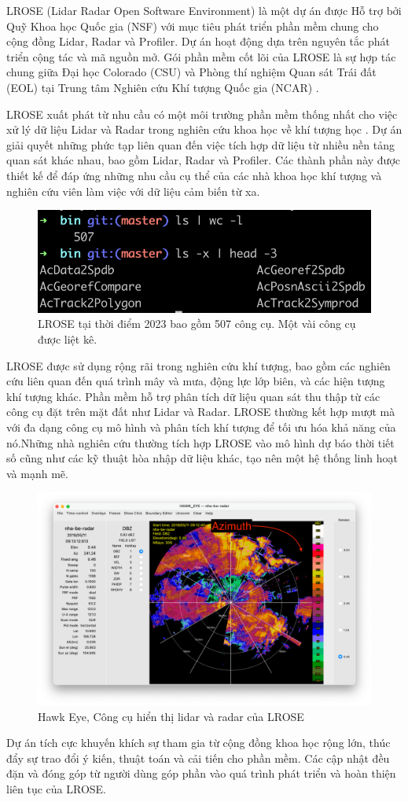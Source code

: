 LROSE (Lidar Radar Open Software Environment) là một dự án được Hỗ trợ bởi Quỹ Khoa học Quốc gia (NSF) với mục tiêu phát triển phần mềm chung cho cộng đồng Lidar, Radar và Profiler. Dự án hoạt động dựa trên nguyên tắc phát triển cộng tác và mã nguồn mở. Gói phần mềm cốt lõi của LROSE là sự hợp tác chung giữa Đại học Colorado (CSU) và Phòng thí nghiệm Quan sát Trái đất (EOL) tại Trung tâm Nghiên cứu Khí tượng Quốc gia (NCAR) \cite{lrose}.

LROSE xuất phát từ nhu cầu có một môi trường phần mềm thống nhất cho việc xử lý dữ liệu Lidar và Radar trong nghiên cứu khoa học về khí tượng học \cite{lrose}.
Dự án giải quyết những phức tạp liên quan đến việc tích hợp dữ liệu từ nhiều nền tảng quan sát khác nhau, bao gồm Lidar, Radar và Profiler. Các thành phần này được thiết kế để đáp ứng những nhu cầu cụ thể của các nhà khoa học khí tượng và nghiên cứu viên làm việc với dữ liệu cảm biến từ xa.

\begin{figure}[H]
    \centering
    \includegraphics[width=0.55\linewidth]{Images/3.5-lrose-tools.png}
    \vspace{1em}
    \caption{LROSE tại thời điểm 2023 bao gồm 507 công cụ. Một vài công cụ được liệt kê.}
    \label{fig:lrose-tool}
\end{figure}

LROSE được sử dụng rộng rãi trong nghiên cứu khí tượng, bao gồm các nghiên cứu liên quan đến quá trình mây và mưa, động lực lớp biên, và các hiện tượng khí tượng khác. Phần mềm hỗ trợ phân tích dữ liệu quan sát thu thập từ các công cụ đặt trên mặt đất như Lidar và Radar. LROSE thường kết hợp mượt mà với đa dạng công cụ mô hình và phân tích khí tượng để tối ưu hóa khả năng của nó.Những nhà nghiên cứu thường tích hợp LROSE vào mô hình dự báo thời tiết số cũng như các kỹ thuật hòa nhập dữ liệu khác, tạo nên một hệ thống linh hoạt và mạnh mẽ.

\begin{figure}[H]
    \centering
    \includegraphics[width=0.8\linewidth]{Images/3.5-hawk-eye.png}
    \caption{Hawk Eye, Công cụ hiển thị lidar và radar của LROSE}
    \label{fig:hawk-eye}
\end{figure}

Dự án tích cực khuyến khích sự tham gia từ cộng đồng khoa học rộng lớn, thúc đẩy sự trao đổi ý kiến, thuật toán và cải tiến cho phần mềm.
Các cập nhật đều đặn và đóng góp từ người dùng góp phần vào quá trình phát triển và hoàn thiện liên tục của LROSE.